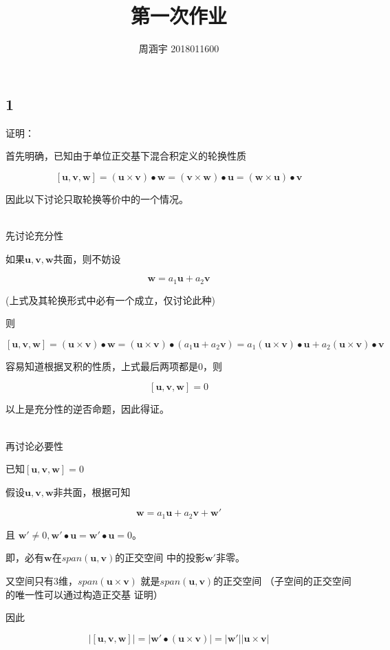 \documentclass[UTF8,c5size]{ctexart}
\title{{\bfseries 第一次作业}}
\author{周涵宇 2018011600}
\date{}
\begin{document}
\maketitle

\subsection*{1}

证明：

首先明确，已知由于单位正交基下混合积定义的轮换性质

$$
[\bm{u},\bm{v},\bm{w}]=
(\bm{u}\times\bm{v})\bullet\bm{w}
=(\bm{v}\times\bm{w})\bullet\bm{u}
=(\bm{w}\times\bm{u})\bullet\bm{v}
$$

因此以下讨论只取轮换等价中的一个情况。

~\\

先讨论充分性

如果$\bm{u},\bm{v},\bm{w}$共面，则不妨设

$$
\bm{w}=a_1\bm{u}+a_2\bm{v}
$$

(上式及其轮换形式中必有一个成立，仅讨论此种)

则

$$
[\bm{u},\bm{v},\bm{w}]=
(\bm{u}\times\bm{v})\bullet\bm{w}
=(\bm{u}\times\bm{v})\bullet(a_1\bm{u}+a_2\bm{v})
=a_1(\bm{u}\times\bm{v})\bullet\bm{u}+
a_2(\bm{u}\times\bm{v})\bullet\bm{v}
$$

容易知道根据叉积的性质，上式最后两项都是0，则

$$
[\bm{u},\bm{v},\bm{w}]=0
$$

以上是充分性的逆否命题，因此得证。

~\\

再讨论必要性

已知$[\bm{u},\bm{v},\bm{w}]=0$

假设$\bm{u},\bm{v},\bm{w}$非共面，根据可知

$$
\bm{w}=a_1\bm{u}+a_2\bm{v}+\bm{w'}
$$

且
$
\bm{w'}\neq 0, 
\bm{w'}\bullet\bm{u}=\bm{w'}\bullet\bm{u}=0
$。

即，必有$\bm{w}$在$span(\bm{u},\bm{v})$的正交空间
中的投影$\bm{w'}$非零。

又空间只有3维，$span(\bm{u}\times\bm{v})$
就是$span(\bm{u},\bm{v})$的正交空间
（子空间的正交空间的唯一性可以通过构造正交基
证明）

因此

$$
\left|[\bm{u},\bm{v},\bm{w}]\right|
=\left|\bm{w'}\bullet(\bm{u}\times\bm{v})\right|
=|\bm{w'}||\bm{u}\times\bm{v}|
$$
\end{document}
